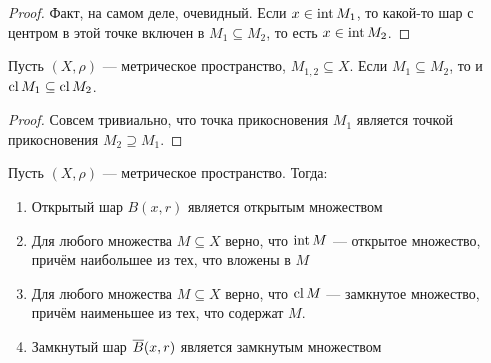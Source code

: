 \begin{proof}
	Факт, на самом деле, очевидный. Если $x \in \operatorname{int} M_1$, то какой-то шар с центром в этой точке включен в $M_1 \subseteq M_2$, то есть $x \in \operatorname{int} M_2$.
\end{proof}

\begin{lemma}
	Пусть $(X, \rho)$ --- метрическое пространство, $M_{1, 2} \subseteq X$. Если $M_1 \subseteq M_2$, то и $\operatorname{cl} M_1 \subseteq \operatorname{cl} M_2$.
\end{lemma}

\begin{proof}
	Совсем тривиально, что точка прикосновения $M_1$ является точкой прикосновения $M_2 \supseteq M_1$.
\end{proof}

\begin{theorem}
	Пусть $(X, \rho)$ --- метрическое пространство. Тогда:
	\begin{enumerate}
		\item Открытый шар $B(x, r)$ является открытым множеством
		
		\item Для любого множества $M \subseteq X$ верно, что $\operatorname{int} M$ --- открытое множество, причём наибольшее из тех, что вложены в $M$
		
		\item Для любого множества $M \subseteq X$ верно, что $\operatorname{cl} M$ --- замкнутое множество, причём наименьшее из тех, что содержат $M$.
		
		\item Замкнутый шар $\overline{B}(x, r)$ является замкнутым множеством
	\end{enumerate}
\end{theorem}

